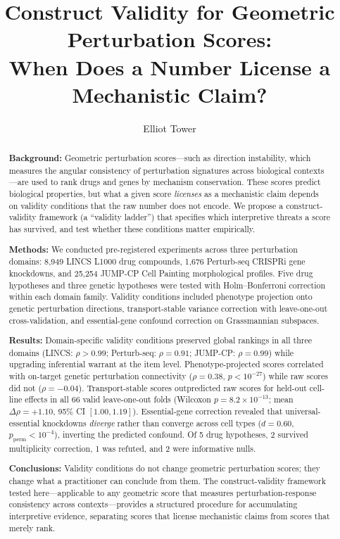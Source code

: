 \documentclass[10pt]{article}
\title{Construct Validity for Geometric Perturbation Scores:\\ When Does a Number License a Mechanistic Claim?}
\author{Elliot Tower}
\affil{Independent Researcher, elliot@elliottower.ai}
\begin{document}
\maketitle

\begin{abstract}
\textbf{Background:}
Geometric perturbation scores---such as direction instability, which
measures the angular consistency of perturbation signatures across
biological contexts---are used to rank drugs and genes by mechanism
conservation. These scores predict biological properties, but what
a given score \emph{licenses} as a mechanistic claim depends on
validity conditions that the raw number does not encode. We
propose a construct-validity framework (a ``validity ladder'') that
specifies which interpretive threats a score has survived, and test
whether these conditions matter empirically.

\textbf{Methods:}
We conducted pre-registered experiments across three perturbation
domains: 8{,}949 LINCS L1000 drug compounds, 1{,}676 Perturb-seq
CRISPRi gene knockdowns, and 25{,}254 JUMP-CP Cell Painting
morphological profiles. Five drug hypotheses and three genetic
hypotheses were tested with Holm--Bonferroni correction within each
domain family. Validity conditions included phenotype projection
onto genetic perturbation directions, transport-stable variance
correction with leave-one-out cross-validation, and essential-gene
confound correction on Grassmannian subspaces.

\textbf{Results:}
Domain-specific validity conditions preserved global rankings in all
three domains (LINCS: $\rho > 0.99$; Perturb-seq: $\rho = 0.91$;
JUMP-CP: $\rho = 0.99$) while upgrading inferential warrant at the
item level. Phenotype-projected scores correlated with on-target
genetic perturbation connectivity ($\rho = 0.38$, $p < 10^{-27}$)
while raw scores did not ($\rho = -0.04$). Transport-stable scores
outpredicted raw scores for held-out cell-line effects in all 66
valid leave-one-out folds (Wilcoxon $p = 8.2 \times 10^{-13}$;
mean $\Delta\rho = +1.10$, 95\% CI $[1.00, 1.19]$). Essential-gene
correction revealed that universal-essential knockdowns
\emph{diverge} rather than converge across cell types ($d = 0.60$,
$p_{\text{perm}} < 10^{-4}$), inverting the predicted confound.
Of 5 drug hypotheses, 2 survived multiplicity correction, 1 was
refuted, and 2 were informative nulls.

\textbf{Conclusions:}
Validity conditions do not change geometric perturbation scores;
they change what a practitioner can conclude from them. The
construct-validity framework tested here---applicable to any
geometric score that measures perturbation-response consistency
across contexts---provides a structured procedure for accumulating
interpretive evidence, separating scores that license mechanistic
claims from scores that merely rank.
\end{abstract}
\end{document}
